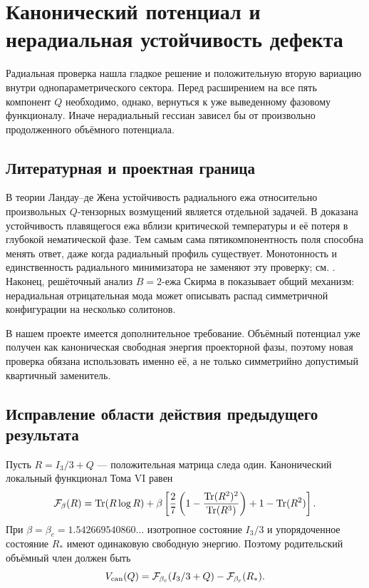 \chapter{Канонический потенциал и нерадиальная устойчивость дефекта}

Радиальная проверка нашла гладкое решение и положительную вторую вариацию
внутри однопараметрического сектора. Перед расширением на все пять компонент
$Q$ необходимо, однако, вернуться к уже выведенному фазовому функционалу.
Иначе нерадиальный гессиан зависел бы от произвольно продолженного объёмного
потенциала.

\section{Литературная и проектная граница}

В теории Ландау--де Жена устойчивость радиального ежа относительно
произвольных $Q$-тензорных возмущений является отдельной задачей. В
 доказана устойчивость плавящегося ежа вблизи
критической температуры и её потеря в глубокой нематической фазе. Тем самым
сама пятикомпонентность поля способна менять ответ, даже когда радиальный
профиль существует. Монотонность и единственность радиального минимизатора
не заменяют эту проверку; см. . Наконец, решёточный
анализ $B=2$-ежа Скирма в  показывает общий
механизм: нерадиальная отрицательная мода может описывать распад
симметричной конфигурации на несколько солитонов.

В нашем проекте имеется дополнительное требование. Объёмный потенциал уже
получен как каноническая свободная энергия проекторной фазы, поэтому новая
проверка обязана использовать именно её, а не только симметрийно допустимый
квартичный заменитель.

\section{Исправление области действия предыдущего результата}

Пусть $R=I_3/3+Q$ --- положительная матрица следа один. Канонический
локальный функционал Тома VI равен
\begin{equation}
 \mathcal F_\beta(R)=
 \operatorname{Tr}(R\log R)+\beta\left[
 \frac27\left(1-\frac{\operatorname{Tr}(R^2)^2}{\operatorname{Tr}(R^3)}\right)
 +1-\operatorname{Tr}(R^2)\right].
 \label{eq:v6-canonical-local-free-energy}
\end{equation}
При $\beta=\beta_c=1.542669540860\ldots$ изотропное состояние $I_3/3$ и
упорядоченное состояние $R_*$ имеют одинаковую свободную энергию. Поэтому
родительский объёмный член должен быть
\begin{equation}
 V_{\rm can}(Q)=
 \mathcal F_{\beta_c}(I_3/3+Q)-\mathcal F_{\beta_c}(R_*).
 \label{eq:v6-canonical-defect-potential}
\end{equation}

